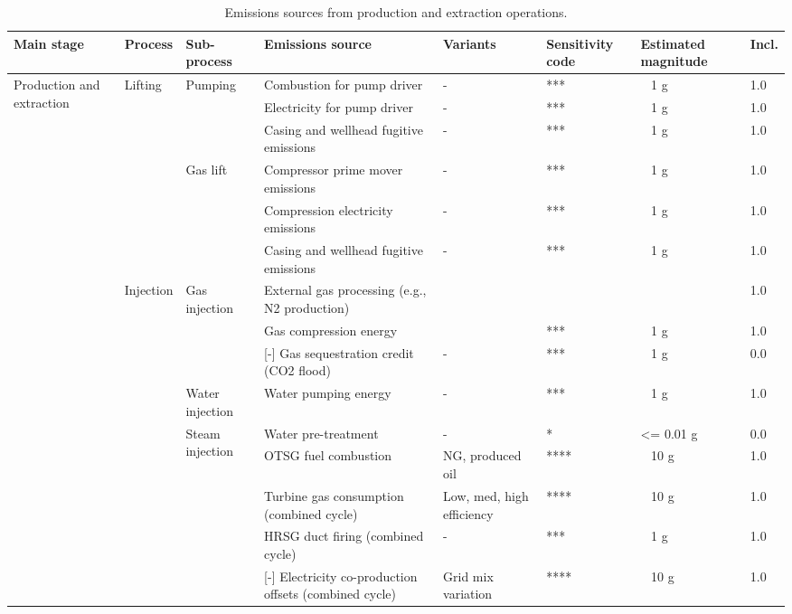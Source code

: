 \documentclass[11pt]{report}
\begin{document}
{{{{\begin{landscape}
\begin{table}
\begin{scriptsize}
\caption{Emissions sources from production and extraction operations.}
\label{tab:production_sources}
\begin{tabular}{|p{}|p{}|p{}|p{}|p{}|p{}|p{}|p{}|}
\hline
\textbf{Main stage} & \textbf{Process} & \textbf{Sub-process} & \textbf{Emissions source} & \textbf{Variants}& \textbf{Sensitivity code} & \textbf{Estimated magnitude} & \textbf{Incl.}\\
\hline
\multirow{22}{0.08\columnwidth}{Production and extraction} & \multirow{6}{*}{Lifting} & \multirow{3}{*}{Pumping} & Combustion for pump driver & - & *** & ~ 1 g & 1.0\\
\cline{4-8}
& & & Electricity for pump driver & - & *** & ~ 1 g & 1.0\\
\cline{4-8}
& & & Casing and wellhead fugitive emissions & - & *** & ~ 1 g & 1.0\\
\cline{3-8}
& & \multirow{3}{*}{Gas lift} & Compressor prime mover emissions & - & *** & ~ 1 g & 1.0\\
\cline{4-8}
& & & Compression electricity emissions & - & *** & ~ 1 g & 1.0\\
\cline{4-8}
& & & Casing and wellhead fugitive emissions & - & *** & ~ 1 g & 1.0\\
\cline{2-8}
& \multirow{16}{*}{Injection} & \multirow{3}{*}{Gas injection} & External gas processing (e.g., N2 production) & & & & 1.0\\
\cline{4-8}
& & & Gas compression energy & & *** & ~ 1 g & 1.0\\
\cline{4-8}
& & & [-] Gas sequestration credit (CO2 flood) & - & *** & ~ 1 g & 0.0\\
\cline{3-8}
& & Water injection & Water pumping energy & - & *** & ~ 1 g & 1.0\\
\cline{3-8}
& & \multirow{6}{*}{Steam injection} & Water pre-treatment & - & * & <= 0.01 g & 0.0\\
\cline{4-8}
& & & OTSG fuel combustion & NG, produced oil & **** & ~ 10 g & 1.0\\
\cline{4-8}
& & & Turbine gas consumption (combined cycle) & Low, med, high efficiency & **** & ~ 10 g & 1.0\\
\cline{4-8}
& & & HRSG duct firing (combined cycle) & - & *** & ~ 1 g & 1.0\\
\cline{4-8}
& & & [-] Electricity co-production offsets (combined cycle) & Grid mix variation & **** & ~ 10 g & 1.0\\

\end{tabular}
\end{scriptsize}
\end{table}
\end{landscape}}}}}
\end{document}
